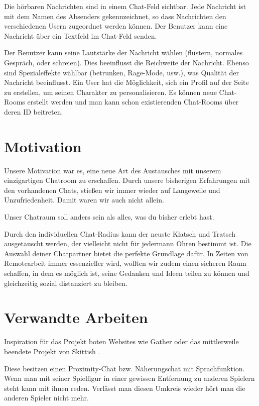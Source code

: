 \documentclass[conference]{IEEEtran}
\begin{document}
	Die hörbaren Nachrichten sind in einem Chat-Feld sichtbar. Jede Nachricht ist mit dem Namen des Absenders gekennzeichnet, so dass Nachrichten den verschiedenen Usern zugeordnet werden können. Der Benutzer kann eine Nachricht über ein Textfeld im Chat-Feld senden.
	
	Der Benutzer kann seine Lautstärke der Nachricht wählen (flüstern, normales Gespräch, oder schreien). Dies beeinflusst die Reichweite der Nachricht. Ebenso sind Spezialeffekte wählbar (betrunken, Rage-Mode, usw.), was Qualität der Nachricht beeinflusst. Ein User hat die Möglichkeit, sich ein Profil auf der Seite zu erstellen, um seinen Charakter zu personalisieren. Es können neue Chat-Rooms erstellt werden und man kann schon existierenden Chat-Rooms über deren ID beitreten.
	\ \\

	\section{Motivation}
	Unsere Motivation war es, eine neue Art des Austausches mit unserem einzigartigen Chatroom zu erschaffen. 
	Durch unsere bisherigen Erfahrungen mit den vorhandenen Chats, stießen wir immer wieder auf Langeweile und Unzufriedenheit. Damit waren wir auch nicht allein.
	
	Unser Chatraum soll anders sein als alles, was du bisher erlebt hast.
	
	Durch den individuellen Chat-Radius kann der neuste Klatsch und Tratsch ausgetauscht werden, der vielleicht nicht für jedermann Ohren bestimmt ist. Die Auswahl deiner Chatpartner bietet die perfekte Grundlage dafür. 
	In Zeiten von Remotearbeit immer essenzieller wird, wollten wir zudem einen sicheren Raum schaffen, in dem es möglich ist, seine Gedanken und Ideen teilen zu können und gleichzeitig sozial distanziert zu bleiben.
	\ \\

	\section{Verwandte Arbeiten}
	Inspiration für das Projekt boten Websites wie Gather \cite{gathertown} oder das mittlerweile beendete Projekt von Skittish \cite{skittish}.
	
	Diese besitzen einen Proximity-Chat bzw. Näherungschat mit Sprachfunktion. Wenn man mit seiner Spielfigur in einer gewissen Entfernung zu anderen Spielern steht kann mit ihnen reden. Verlässt man diesen Umkreis wieder hört man die anderen Spieler nicht mehr.
	
\end{document}
